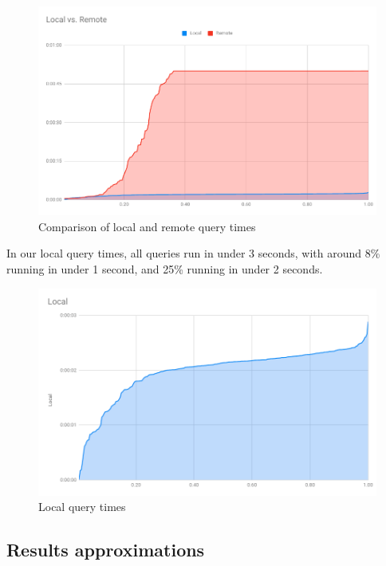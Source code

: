 \begin{figure}[H]
    \centering
        \includegraphics[width=\linewidth]{imagenes/queryRuntimeCompared.png}
        \caption{Comparison of local and remote query times}
        \label{fig:runtimeCompare}
\end{figure}

In our local query times, all queries run in under 3 seconds, with around 8\% running in under 1 second, and 25\% running in under 2 seconds.

\begin{figure}[h]
    \centering
        \includegraphics[width=\linewidth]{imagenes/localQueryRuntime.png}
        \caption{Local query times}
        \label{fig:runtimeLocal}
\end{figure}

\subsection{Results approximations}

